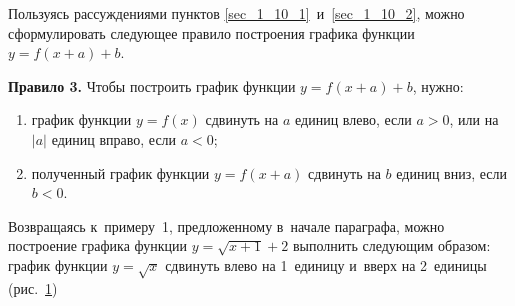 
Пользуясь рассуждениями пунктов \ref{sec_1_10_1}~и~\ref{sec_1_10_2},
можно сформулировать следующее правило построения графика функции $y = f(x+a) + b$.

\textbf{Правило 3.} Чтобы построить график функции $y = f(x+a) + b$,
нужно:
\begin{enumerate}
\item график функции $y = f(x)$ сдвинуть на $a$ единиц влево,
если $a > 0$, или на $|a|$ единиц вправо, если $a < 0$;
\item полученный график функции $y = f(x+a)$ сдвинуть на $b$ единиц
вниз, если $b < 0$.
\end{enumerate}

\begin{figure}
\end{figure}

Возвращаясь к~примеру~1, предложенному в~начале параграфа,
можно построение графика функции $y = \sqrt{x + 1} + 2$
выполнить следующим образом: график функции $y = \sqrt{x}$ 
сдвинуть влево на 1~единицу и~вверх на 2~единицы (рис.\ \ref{fig_1_10_24})

\begin{figure}\label{fig_1_10_24}
\end{figure}

